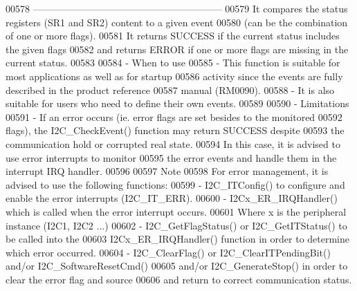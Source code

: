\begin{DoxyCode}
00578 \textcolor{comment}{     -----------------------------------------------------------}
00579 \textcolor{comment}{        It compares the status registers (SR1 and SR2) content to a given event}
00580 \textcolor{comment}{        (can be the combination of one or more flags).}
00581 \textcolor{comment}{        It returns SUCCESS if the current status includes the given flags }
00582 \textcolor{comment}{        and returns ERROR if one or more flags are missing in the current status.}
00583 \textcolor{comment}{}
00584 \textcolor{comment}{          - When to use}
00585 \textcolor{comment}{             - This function is suitable for most applications as well as for startup }
00586 \textcolor{comment}{               activity since the events are fully described in the product reference }
00587 \textcolor{comment}{               manual (RM0090).}
00588 \textcolor{comment}{             - It is also suitable for users who need to define their own events.}
00589 \textcolor{comment}{}
00590 \textcolor{comment}{          - Limitations}
00591 \textcolor{comment}{             - If an error occurs (ie. error flags are set besides to the monitored }
00592 \textcolor{comment}{               flags), the I2C\_CheckEvent() function may return SUCCESS despite }
00593 \textcolor{comment}{               the communication hold or corrupted real state. }
00594 \textcolor{comment}{               In this case, it is advised to use error interrupts to monitor }
00595 \textcolor{comment}{               the error events and handle them in the interrupt IRQ handler.}
00596 \textcolor{comment}{         }
00597 \textcolor{comment}{     Note }
00598 \textcolor{comment}{         For error management, it is advised to use the following functions:}
00599 \textcolor{comment}{           - I2C\_ITConfig() to configure and enable the error interrupts (I2C\_IT\_ERR).}
00600 \textcolor{comment}{           - I2Cx\_ER\_IRQHandler() which is called when the error interrupt occurs.}
00601 \textcolor{comment}{             Where x is the peripheral instance (I2C1, I2C2 ...)}
00602 \textcolor{comment}{           - I2C\_GetFlagStatus() or I2C\_GetITStatus()  to be called into the }
00603 \textcolor{comment}{             I2Cx\_ER\_IRQHandler() function in order to determine which error occurred.}
00604 \textcolor{comment}{           - I2C\_ClearFlag() or I2C\_ClearITPendingBit() and/or I2C\_SoftwareResetCmd() }
00605 \textcolor{comment}{             and/or I2C\_GenerateStop() in order to clear the error flag and source }
00606 \textcolor{comment}{             and return to correct  communication status.}

\end{DoxyCode}
